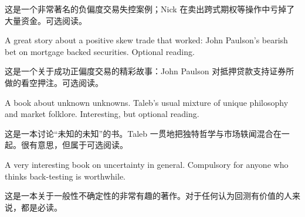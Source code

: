 \begin{chineseblock}这是一个非常著名的负偏度交易失控案例；Nick 在卖出跨式期权等操作中亏掉了大量资金。可选阅读。\end{chineseblock}


\begin{englishblock} A great story about a positive skew trade that worked: John Paulson's bearish bet on mortgage backed securities. Optional reading. \end{englishblock}

\begin{chineseblock}这是一个关于成功正偏度交易的精彩故事：John Paulson 对抵押贷款支持证券所做的看空押注。可选阅读。\end{chineseblock}


\begin{englishblock} A book about unknown unknowns. Taleb's usual mixture of unique philosophy and market folklore. Interesting, but optional reading. \end{englishblock}

\begin{chineseblock}这是一本讨论“未知的未知”的书。Taleb 一贯地把独特哲学与市场轶闻混合在一起。很有意思，但属于可选阅读。\end{chineseblock}



\begin{englishblock} A very interesting book on uncertainty in general. Compulsory for anyone who thinks back-testing is worthwhile. \end{englishblock}

\begin{chineseblock}这是一本关于一般性不确定性的非常有趣的著作。对于任何认为回测有价值的人来说，都是必读。\end{chineseblock}



